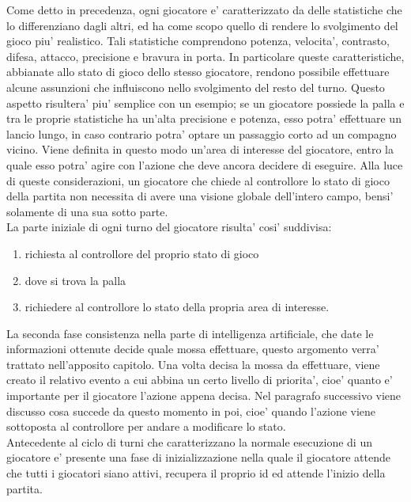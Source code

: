 Come detto in precedenza, ogni giocatore e' caratterizzato da delle statistiche che lo differenziano dagli altri, ed ha come scopo quello di rendere lo svolgimento del gioco piu' realistico. Tali statistiche comprendono potenza, velocita', contrasto, difesa, attacco, precisione e bravura in porta. In particolare queste caratteristiche, abbianate allo stato di gioco dello stesso giocatore, rendono possibile effettuare alcune assunzioni che influiscono nello svolgimento del resto del turno. Questo aspetto risultera' piu' semplice con un esempio; se un giocatore possiede la palla e tra le proprie statistiche ha un'alta precisione e potenza, esso potra' effettuare un lancio lungo, in caso contrario potra' optare un passaggio corto ad un compagno vicino. Viene definita in questo modo un'area di interesse del giocatore, entro la quale esso potra' agire con l'azione che deve ancora decidere di eseguire. Alla luce di queste considerazioni, un giocatore che chiede al controllore lo stato di gioco della partita non necessita di avere una visione globale dell'intero campo, bensi' solamente di una sua sotto parte.\\

La parte iniziale di ogni turno del giocatore risulta' cosi' suddivisa:\\

\begin{enumerate}
	\item richiesta al controllore del proprio stato di gioco
	\item dove si trova la palla
	\item richiedere al controllore lo stato della propria area di interesse.
\end{enumerate}

La seconda fase consistenza nella parte di intelligenza artificiale, che date le informazioni ottenute decide quale mossa effettuare, questo argomento verra' trattato nell'apposito capitolo. Una volta decisa la mossa da effettuare, viene creato il relativo evento a cui abbina un certo livello di priorita', cioe' quanto e' importante per il giocatore l'azione appena decisa. Nel paragrafo successivo viene discusso cosa succede da questo momento in poi, cioe' quando l'azione viene sottoposta al controllore per andare a modificare lo stato.\\

Antecedente al ciclo di turni che caratterizzano la normale esecuzione di un giocatore e' presente una fase di inizializzazione nella quale il giocatore attende che tutti i giocatori siano attivi, recupera il proprio id ed attende l'inizio della partita.\\

